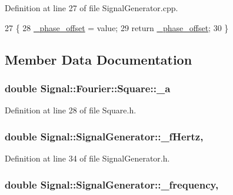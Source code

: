 Definition at line 27 of file Signal\+Generator.\+cpp.


\begin{DoxyCode}
27                                                                    \{
28     \hyperlink{classSignal_1_1SignalGenerator_a6b4444d46747c8517171edbbf4b5588f}{\_phase\_offset} = value;
29     \textcolor{keywordflow}{return} \hyperlink{classSignal_1_1SignalGenerator_a6b4444d46747c8517171edbbf4b5588f}{\_phase\_offset};
30 \}
\end{DoxyCode}


\subsection{Member Data Documentation}
\hypertarget{classSignal_1_1Fourier_1_1Square_a1de35055cfcab4d4bae2d72273c34f3f}{
\subsubsection[{\+\_\+a}]{\setlength{\rightskip}{0pt plus 5cm}double Signal\+::\+Fourier\+::\+Square\+::\+\_\+a\hspace{0.3cm}{\ttfamily [protected]}}}\label{classSignal_1_1Fourier_1_1Square_a1de35055cfcab4d4bae2d72273c34f3f}


Definition at line 28 of file Square.\+h.

\hypertarget{classSignal_1_1SignalGenerator_a85a4702347352bab1c71e0a8df8437d6}{
\subsubsection[{\+\_\+f\+Hertz}]{\setlength{\rightskip}{0pt plus 5cm}double Signal\+::\+Signal\+Generator\+::\+\_\+f\+Hertz\hspace{0.3cm}{\ttfamily [protected]}, {\ttfamily [inherited]}}}\label{classSignal_1_1SignalGenerator_a85a4702347352bab1c71e0a8df8437d6}


Definition at line 34 of file Signal\+Generator.\+h.

\hypertarget{classSignal_1_1SignalGenerator_a7f107461333bce68c5dad412db96a8c2}{
\subsubsection[{\+\_\+frequency}]{\setlength{\rightskip}{0pt plus 5cm}double Signal\+::\+Signal\+Generator\+::\+\_\+frequency\hspace{0.3cm}{\ttfamily [protected]}, {\ttfamily [inherited]}}}\label{classSignal_1_1SignalGenerator_a7f107461333bce68c5dad412db96a8c2}


